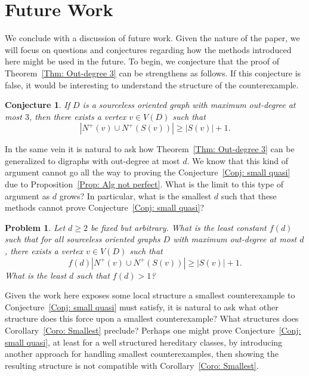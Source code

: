 \documentclass[12pt]{article}
\newtheorem{conjecture}[theorem]{Conjecture}
\newtheorem{problem}[theorem]{Problem}
\theoremstyle{definition}
\begin{document}
\section{Future Work}

We conclude with a discussion of future work.
Given the nature of the paper, we will focus on questions and conjectures regarding how the methods introduced here
might be used in the future.
To begin, we conjecture that the proof of Theorem~\ref{Thm: Out-degree 3}
can be strengthens as follows.
If this conjecture is false, it would be interesting to understand
the structure of the counterexample.

\begin{conjecture}
    If $D$ is a sourceless oriented graph with maximum out-degree at most $3$, then 
    there exists a vertex $v \in V(D)$ such that
    \[
    |N^+(v)\cup N^+(S(v))|\geq |S(v)|+1.
    \]
\end{conjecture}

In the same vein it is natural to ask
how Theorem~\ref{Thm: Out-degree 3} can be generalized to digraphs with out-degree at most $d$.
We know that this kind of argument cannot go all the way to proving the Conjecture~\ref{Conj: small quasi}
due to Proposition~\ref{Prop: Alg not perfect}.
What is the limit to this type of argument as $d$ grows?
In particular, what is the smallest $d$ such that these methods cannot prove Conjecture~\ref{Conj: small quasi}?

\begin{problem}
    Let $d\geq 2$ be fixed but arbitrary.
    What is the least constant $f(d)$ such that
    for all  sourceless oriented graphs $D$ with maximum out-degree at most $d$, there 
    exists a vertex $v \in V(D)$ such that
    \[
    f(d)|N^+(v)\cup N^+(S(v))|\geq |S(v)|+1.
    \]
    What is the least $d$ such that $f(d)>1$?
\end{problem}


Given the work here exposes some local structure a smallest counterexample 
to Conjecture~\ref{Conj: small quasi} must satisfy,
it is natural to ask what other structure does this force upon a smallest counterexample?
What structures does Corollary~\ref{Coro: Smallest} preclude?
Perhaps one might prove Conjecture~\ref{Conj: small quasi}, 
at least for a well structured hereditary classes,
by introducing another approach for handling smallest counterexamples,
then showing the resulting structure is not compatible with Corollary~\ref{Coro: Smallest}.
\end{document}
